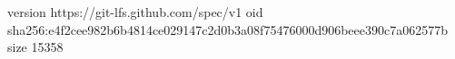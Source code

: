 version https://git-lfs.github.com/spec/v1
oid sha256:e4f2cee982b6b4814ce029147c2d0b3a08f75476000d906beee390c7a062577b
size 15358
